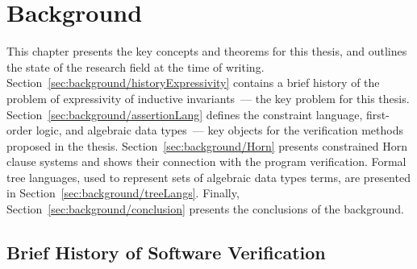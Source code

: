 \chapter{Background}\label{ch:background}

This chapter presents the key concepts and theorems for this thesis, and outlines the state of the research field at the time of writing.
Section~\cref{sec:background/historyExpressivity} contains a brief history of the problem of expressivity of inductive invariants~--- the key problem for this thesis.
Section~\cref{sec:background/assertionLang} defines the constraint language, first-order logic, and algebraic data types~--- key objects for the verification methods proposed in the thesis.
Section~\cref{sec:background/Horn} presents constrained Horn clause systems and shows their connection with the program verification.
Formal tree languages, used to represent sets of algebraic data types terms, are presented in Section~\cref{sec:background/treeLangs}.
Finally, Section~\cref{sec:background/conclusion} presents the conclusions of the background.


\section{Brief History of Software Verification}\label{sec:background/historyVerification}

